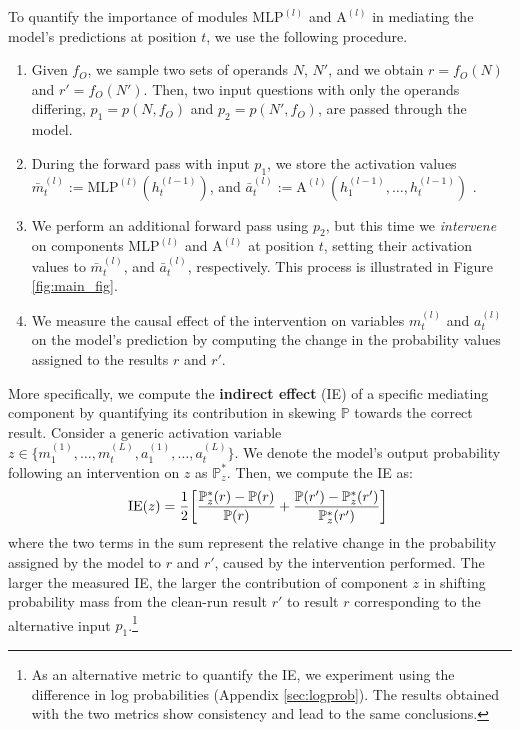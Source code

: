\documentclass[11pt]{article}
\newcommand{\atl}[2]{#1^{(#2)}}
\begin{document}
To quantify the importance of modules $\atl{\mathrm{MLP}}{l}$ and $\atl{\mathrm{A}}{l}$
in mediating the model's predictions at position $t$, we use the following procedure.
\begin{enumerate}[left=0mm]
    \item Given $f_O$, we sample two sets of operands $N$, $N'$, and we obtain $r = f_O(N)$ and $r' = f_O(N')$. Then, two input questions with only the operands differing, $p_1 = p(N, f_O)$ and $p_2 = p(N', f_O)$, are passed through the model.
    \item During the forward pass with input $p_1$, we store the activation values $\atl{\bar{m}}{l}_{t} := \atl{\mathrm{MLP}}{l}(\atl{h}{l-1}_{t})$, and $\atl{\bar{a}}{l}_{t} := \atl{\mathrm{A}}{l}(\atl{h}{l-1}_{1}, \dots, \atl{h}{l-1}_{t})$ .
    \item We perform an additional forward pass using $p_2$, but this time we \textit{intervene} on components $\atl{\mathrm{MLP}}{l}$ and $\atl{\mathrm{A}}{l}$ at position $t$, setting their activation values to $\atl{\bar{m}}{l}_{t}$, and $\atl{\bar{a}}{l}_{t}$, respectively. This process is illustrated in Figure \ref{fig:main_fig}.
    \item We measure the causal effect of the intervention on variables $\atl{m}{l}_{t}$ and $\atl{a}{l}_{t}$ on the model's prediction by computing the change in the probability values assigned to the results $r$ and $r'$.
    \label{step:compute_eff}
\end{enumerate}

More specifically, we compute the \textbf{indirect effect} (IE) of a specific mediating component by quantifying its contribution in skewing $\mathbb{P}$ towards the correct result.
Consider a generic activation variable $z \in \{\atl{m}{1}_{1}, \dots, \atl{m}{L}_{t}, \atl{a}{1}_{1}, \dots, \atl{a}{L}_{t} \}$.
We denote the model's output probability following an intervention on $z$ as $\mathbb{P}_{z}^*$.
Then, we compute the IE as:
\begin{align}
    \label{eq:ie}
    \hspace{-2mm}\mathrm{IE}(z)=\frac{1}{2} \bigg[ \frac{\mathbb{P}_z^*(r) - \mathbb{P}(r)}{\mathbb{P}(r)} + \frac{\mathbb{P}(r') - \mathbb{P}_z^*(r')}{\mathbb{P}_z^*(r')} \bigg] \hspace{-1mm}
\end{align}
where the two terms in the sum represent the relative change in the probability assigned by the model to $r$ and $r'$, caused by the intervention performed. The larger the measured IE, the larger the contribution of component $z$ in shifting probability mass from the clean-run result $r'$ to result $r$ corresponding to the alternative input $p_1$.\footnote{As an alternative metric to quantify the IE, we experiment using the difference in log probabilities (Appendix \ref{sec:logprob}). The results obtained with the two metrics show consistency and lead to the same conclusions.}
\end{document}
